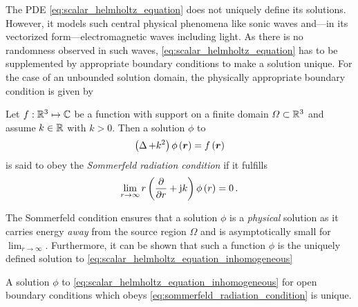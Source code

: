 The \ac{PDE} \eqref{eq:scalar_helmholtz_equation} does not uniquely define
its solutions.
However, it models such central physical phenomena like sonic waves
and---in its vectorized form---electromagnetic waves including light.
As there is no randomness observed in such waves,
\eqref{eq:scalar_helmholtz_equation} has to be supplemented by appropriate
boundary conditions to make a solution unique.
For the case of an unbounded solution domain, the physically appropriate
boundary condition is given by
\begin{definition}
	\label{def:sommerfeld_radiation_condition}
	Let $f: \mathbb{R}^3 \mapsto \mathbb{C}$ be a function with support on a finite domain
	$\Omega \subset \mathbb{R}^3$ and assume $k \in \mathbb{R}$ with $k > 0$.
	Then a solution $\phi$ to
	\begin{equation}\label{eq:scalar_helmholtz_equation_inhomogeneous}
		\left( \laplace + k^2 \right) \phi \left( \robs \right) =
		f \left( \robs \right)
	\end{equation}
	is said to obey the \emph{Sommerfeld radiation condition} if it fulfills
	\cite{Sommerfeld1912}\cite{schot1992}
	\begin{equation}\label{eq:sommerfeld_radiation_condition}
		\lim_{r \to \infty}
		r \left( \frac{\partial}{\partial r} + \mathrm{j} k \right)
		\phi \left( r \right) = 0
		\, .
	\end{equation}
\end{definition}

The Sommerfeld condition ensures that a solution $\phi$ is a \emph{physical}
solution as it carries energy \emph{away} from the source region $\Omega$ and is
asymptotically small for $\lim_{r \to \infty}$.
Furthermore, it can be shown \cite[pp.~190]{Sommerfeld1964} that such a function
$\phi$ is the uniquely defined solution to
\eqref{eq:scalar_helmholtz_equation_inhomogeneous}
\begin{theorem}[Uniqueness]
	A solution $\phi$ to \eqref{eq:scalar_helmholtz_equation_inhomogeneous}
	for open boundary conditions which obeys
	\eqref{eq:sommerfeld_radiation_condition} is unique.
\end{theorem}

